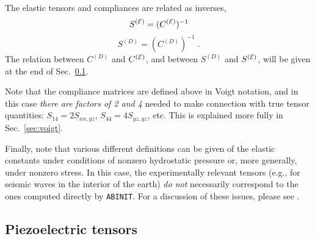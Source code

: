 \documentclass[11pt,fleqn]{article}
\def\beq{\begin{equation}}
\def\eeq{\end{equation}}
\def\E{{\cal E}}
\def\eps{\epsilon}
\def\ABINIT{{{\tt ABINIT}}}
\begin{document}
The elastic tensors and compliances are related as inverses,
%
\beq
S^{(\E)}=(C^{(\E)})^{-1}
\eeq
%
%
\beq
S^{(D)}=(C^{(D)})^{-1} \;.
\eeq
%
The relation between $C^{(D)}$ and $C^{(\E)}$,
and between $S^{(D)}$ and $S^{(\E)}$, will be given
at the end of Sec.~\ref{sec:piezo-tens}.

Note that the compliance matrices are defined above in Voigt
notation, and in this case {\it there are factors of 2 and 4}
needed to make connection with true tensor quantities:
$S_{14}=2S_{xx,yz}$, $S_{44}=4S_{yz,yz}$, etc.  This is explained
more fully in Sec.~\ref{sec:voigt}.

Finally, note that various different definitions can be given of
the elastic constants under conditions of nonzero hydrostatic
pressure or, more generally, under nonzero stress.  In this case,
the experimentally relevant tensors (e.g., for seismic waves in
the interior of the earth) {\it do not} necessarily correspond to the ones
computed directly by \ABINIT.  For a discussion of these issues,
please see \cite{oganov}.

%
%
%
%
%

\subsection{Piezoelectric tensors}
\label{sec:piezo-tens}
\end{document}

